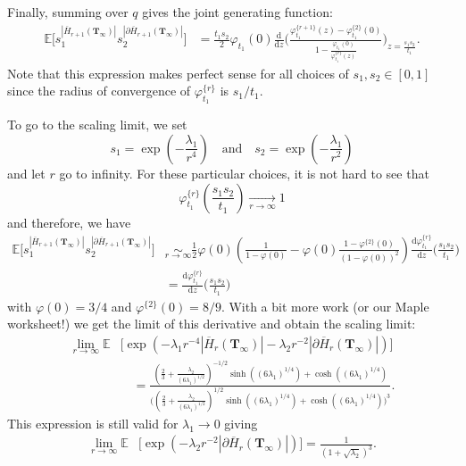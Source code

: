 \documentclass[10pt]{amsart}
\theoremstyle{definition}\newtheorem{defi}[theo]{Definition}\newtheorem{rema}[theo]{Remark}\newtheorem{exam}[theo]{Example}\newtheorem{exem}[theo]{Example}\newtheorem{nota}[theo]{Notation}
\begin{document}
Finally, summing over $q$ gives the joint generating function:
\begin{align*}
\mathbb E \Big[
s_1^{|\overline{H}_{r+1} (\mathbf{T}_{\infty})|} s_2^{|\partial \overline{H}_{r+1} (\mathbf{T}_{\infty})|} \Big]
& = \frac{t_1 s_2}{2} \varphi_{t_1} (0)
\frac{\mathrm d}{\mathrm{d}z} \Bigg(
\frac{\varphi_{t_1}^{\{r+1\}} (z)- \varphi^{\{2\}}_{t_1}(0) }
{1 - \frac{\varphi_{t_1} (0)}{\varphi_{t_1}^{\{r\}}(z)}}
\Bigg)_{z=\frac{s_1 s_2}{t_1}}.
\end{align*}
Note that this expression makes perfect sense for all choices of $s_1,s_2\in [0,1]$ since the radius of convergence of $\varphi_{t_1}^{\{r\}}$ is $s_1/t_1$.


To go to the scaling limit, we set
\[
s_1 = \exp \left( - \frac{\lambda_1}{r^4} \right) \quad \text{and} \quad s_2 = \exp \left( - \frac{\lambda_1}{r^2} \right)
\]
and let $r$ go to infinity. For these particular choices, it is not hard to see that
\[
\varphi_{t_1}^{\{r\}} \left( \frac{s_1 s_2}{t_1} \right) \underset{r \to \infty}{\longrightarrow} 1
\]
and therefore, we have
\begin{align*}
\mathbb E \Big[
s_1^{|\overline{H}_{r+1} (\mathbf{T}_{\infty})|} s_2^{|\partial \overline{H}_{r+1} (\mathbf{T}_{\infty})|} \Big]
& \underset{r \to \infty}{\sim}
\frac{1}{2} \varphi (0)
\left(\frac{1}{1-\varphi(0)} - \varphi(0) \frac{1-\varphi^{\{2\}}(0)}{(1-\varphi(0))^2} \right)
\frac{\mathrm d\varphi_{t_1}^{\{r\}}}{\mathrm{d}z} \Bigg(
\frac{s_1 s_2}{t_1}
\Bigg)\\
& =
\frac{\mathrm d\varphi_{t_1}^{\{r\}}}{\mathrm{d}z} \Bigg(
\frac{s_1 s_2}{t_1} \Bigg)
\end{align*}
with $\varphi(0) = 3/4$ and $\varphi^{\{2\}}(0) = 8/9$. With a bit more work (or our Maple worksheet!) we get the limit of this derivative and obtain the scaling limit:
\begin{align*}
\lim_{r \to \infty}
\mathbb E &\Big[
\exp \left(- \lambda_1 r^{-4}|\overline{H}_{r} (\mathbf{T}_{\infty})| - \lambda_2 r^{-2} |\partial \overline{H}_{r} (\mathbf{T}_{\infty})| \right)\Big]\\
& \quad =
\frac
{
\left(\frac{2}{3} + \frac{\lambda_2}{(6 \lambda_1)^{1/2}} \right)^{-1/2}
\sinh \left( (6 \lambda_1)^{1/4}\right) + \cosh \left( (6 \lambda_1)^{1/4}\right)
}
{\Bigg( \left(\frac{2}{3} + \frac{\lambda_2}{(6 \lambda_1)^{1/2}} \right)^{1/2}
\sinh \left( (6 \lambda_1)^{1/4}\right) + \cosh \left( (6 \lambda_1)^{1/4}\right)\Bigg)^3}.
\end{align*}
This expression is still valid for $\lambda_1 \to 0$ giving
\begin{align*}
\lim_{r \to \infty}
\mathbb E &\Big[
\exp \left(- \lambda_2 r^{-2} |\partial \overline{H}_{r} (\mathbf{T}_{\infty})| \right)\Big]
=
\frac{1}{\left( 1 + \sqrt{\lambda_2}\right)^3}.
\end{align*}
\end{document}
